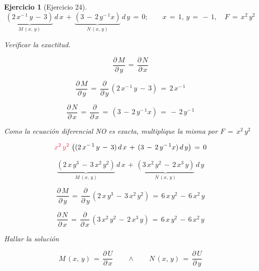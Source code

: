\documentclass[a4paper,11pt]{book}
\newtheorem{ejer}{Ejercicio}[section]
\begin{document}
  

\begin{ejer}[Ejercicio 24] 

  $$\underbrace{(2\,x^{-\,1}\,y\,-\,3)}_{M\,(x,\,y)}\,d\,x\,+\,\underbrace{(3\,-\,2\,y^{-\,1}x)}_{N\,(x,\,y)}\,d\,y\,=\,0; \qquad x\,=\,1, \, y\,=\,-\,1, \quad F\,=\,x^{2}\,y^{2}$$ 

  

 

  

 Verificar la exactitud. 

  

$$\dfrac{\partial\,M}{\partial\,y}\,=\,\dfrac{\partial\,N}{\partial\,x}$$ 

  

$$\dfrac{\partial\,M}{\partial\,y}\,=\,\dfrac{\partial}{\partial\,y}\,(2\,x^{-\,1}\,y\,-\,3)\,=\,2\,x^{-\,1}$$ 

  

$$\dfrac{\partial\,N}{\partial\,x}\,=\,\dfrac{\partial}{\partial\,x}\,=\,(3\,-\,2\,y^{-\,1}x)\,=\,-\,2\,y^{-\,1}$$ 

  

 Como la ecuación diferencial NO es exacta, multiplique la misma por $F\,=\,x^{2}\,y^{2}$ 

  


  

$$\textcolor{amaranth}{x^{2}\,y^{2}}\,\left( (2\,x^{-\,1}\,y\,-\,3)\,d\,x\,+\,(3\,-\,2\,y^{-\,1}x)\,d\,y \right) \,=\,0$$ 

  

$$\underbrace{(2\,x\,y^{3}\,-\,3\,x^{2}\,y^{2})}_{M\,(x,\,y)}\,d\,x\,+\,\underbrace{(3\,x^{2}\,y^{2}\,-\,2\,x^{3}\,y)}_{N\,(x,\,y)}\,d\,y$$ 

  

$$\dfrac{\partial\,M}{\partial\,y}\,=\,\dfrac{\partial}{\partial\,y}\,(2\,x\,y^{3}\,-\,3\,x^{2}\,y^{2})\,=\,\boxed{6\,x\,y^{2}\,-\,6\,x^{2}\,y}$$ 

  

$$\dfrac{\partial\,N}{\partial\,x}\,=\,\dfrac{\partial}{\partial\,x}\,(3\,x^{2}\,y^{2}\,-\,2\,x^{3}\,y)\,=\,\boxed{6\,x\,y^{2}\,-\,6\,x^{2}\,y}$$ 

  

 Hallar la solución 

  

$$\boxed{M\,(x,\,y)\,=\,\dfrac{\partial\,U}{\partial\,x}} \qquad \wedge \qquad \boxed{N\,(x,\,y)\,=\,\dfrac{\partial\,U}{\partial\,y}}$$ 


\end{ejer}
\end{document}
